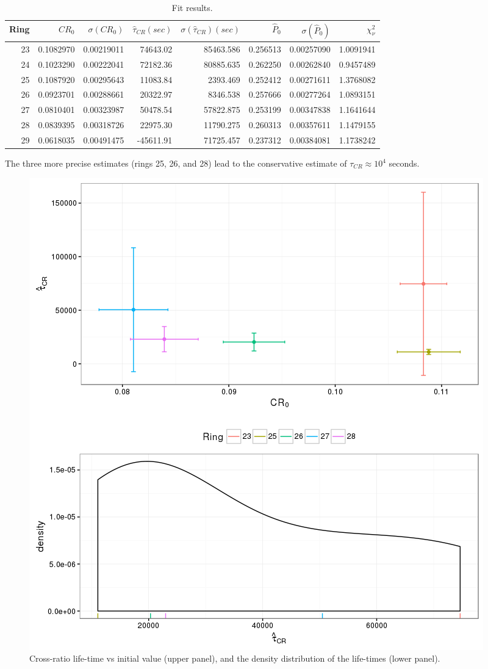 \documentclass{article}
\begin{document}
\begin{table}[h]
	\centering
	\caption{Fit results.\label{tbl:FitRes}}
	\begin{tabular}{rrrrrrrr}
		\hline
		Ring &    $CR_0$ & $\sigma(CR_0)$ & $\hat{\tau}_{CR} (sec)$ & $\sigma(\hat{\tau}_{CR})(sec)$ & $\hat{P}_0$ & $\sigma(\hat{P}_0)$ & $\chi^2_\nu$\\ \hline
		  23 & 0.1082970 &     0.00219011 &                74643.02 &                      85463.586 &    0.256513 &          0.00257090 & 1.0091941\\
		  24 & 0.1023290 &     0.00222041 &                72182.36 &                      80885.635 &    0.262250 &          0.00262840 & 0.9457489\\
		  25 & 0.1087920 &     0.00295643 &                11083.84 &                       2393.469 &    0.252412 &          0.00271611 & 1.3768082\\
		  26 & 0.0923701 &     0.00288661 &                20322.97 &                       8346.538 &    0.257666 &          0.00277264 & 1.0893151\\
		  27 & 0.0810401 &     0.00323987 &                50478.54 &                      57822.875 &    0.253199 &          0.00347838 & 1.1641644\\
		  28 & 0.0839395 &     0.00318726 &                22975.30 &                      11790.275 &    0.260313 &          0.00357611 & 1.1479155\\
		  29 & 0.0618035 &     0.00491475 &               -45611.91 &                      71725.457 &    0.237312 &          0.00384081 & 1.1738242\\ \hline
	\end{tabular}
\end{table}

The three more precise estimates (rings 25, 26, and 28) lead to the conservative estimate of $\tau_{CR}\approx 10^4$ seconds.

\begin{figure}[h]
	\centering
	\includegraphics[scale=.8]{PolAna-CRLTvsCR0}
	\caption{Cross-ratio life-time vs initial value (upper panel), and the density distribution of the life-times (lower panel).\label{fig:R-SepRings}}
\end{figure}
\end{document}
